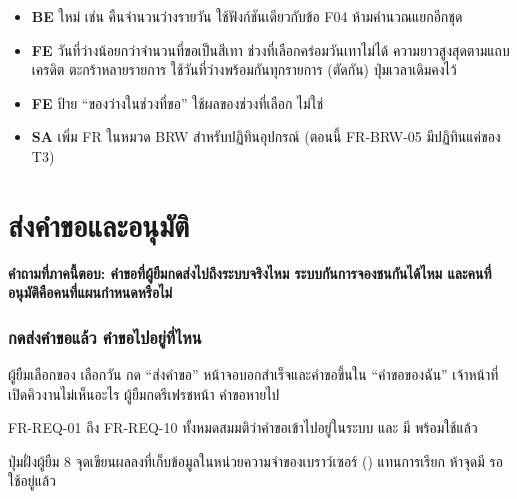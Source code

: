 \begin{itemize}
\item \textbf{BE}  ใหม่ เช่น  คืนจำนวนว่างรายวัน
      ใช้ฟังก์ชันเดียวกับข้อ F04 ห้ามคำนวณแยกอีกชุด
\item \textbf{FE} วันที่ว่างน้อยกว่าจำนวนที่ขอเป็นสีเทา ช่วงที่เลือกคร่อมวันเทาไม่ได้ ความยาวสูงสุดตามแถบเครดิต
      ตะกร้าหลายรายการ ใช้วันที่ว่างพร้อมกันทุกรายการ (ตัดกัน) ปุ่มเวลาเดิมคงไว้
\item \textbf{FE} ป้าย ``ของว่างในช่วงที่ขอ'' ใช้ผลของช่วงที่เลือก ไม่ใช่ 
\item \textbf{SA} เพิ่ม FR ในหมวด BRW สำหรับปฏิทินอุปกรณ์ (ตอนนี้ FR-BRW-05 มีปฏิทินแค่ของ T3)
\end{itemize}

\clearpage
\part{ส่งคำขอและอนุมัติ}

\textbf{คำถามที่ภาคนี้ตอบ: คำขอที่ผู้ยืมกดส่งไปถึงระบบจริงไหม ระบบกันการจองชนกันได้ไหม และคนที่อนุมัติคือคนที่แผนกำหนดหรือไม่}

\section{กดส่งคำขอแล้ว คำขอไปอยู่ที่ไหน}
\label{sec:submit}

ผู้ยืมเลือกของ เลือกวัน กด ``ส่งคำขอ'' หน้าจอบอกสำเร็จและคำขอขึ้นใน ``คำขอของฉัน''
เจ้าหน้าที่เปิดคิวงานไม่เห็นอะไร ผู้ยืมกดรีเฟรชหน้า คำขอหายไป

FR-REQ-01 ถึง FR-REQ-10 ทั้งหมดสมมติว่าคำขอเข้าไปอยู่ในระบบ และ  มี  พร้อมใช้แล้ว

ปุ่มฝั่งผู้ยืม 8 จุดเขียนผลลงที่เก็บข้อมูลในหน่วยความจำของเบราว์เซอร์ () แทนการเรียก 
ห้าจุดมี  รอใช้อยู่แล้ว


